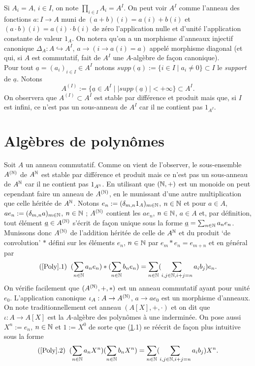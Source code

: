 Si $A_i=A$, $i\in I$, on note $\prod_{i\in I}A_i=A^I$. On peut  voir $A^I$
comme l'anneau des fonctions $a:I\rightarrow A$ muni de $(a+b)(i)=a(i)+b(i)$
et $(a\cdot b)(i)=a(i)\cdot b(i)$  de zéro l'application nulle et d'unité
l'application constante de valeur $1_A$. On notera qu'on a un morphisme
d'anneaux injectif canonique $\Delta_A:A\hookrightarrow A^I$, $a\rightarrow
(i\rightarrow a(i)=a)$ appelé morphisme diagonal (et qui, si $A$ est
commutatif,   fait de $A^I$  une $A$-algèbre de fa\c{c}on canonique).\\

Pour tout $\underline{a}=(a_i)_{i\in I}\in A^I$ notons
$supp(\underline{a}):=\lbrace i\in I\; |\; a_i\not= 0\rbrace\subset I$ le
\textit{support} de $\underline{a}$. Notons $$A^{(I)}:=\lbrace \underline{a}\in
A^I\; |\; |supp(\underline{a})|<+\infty\rbrace \subset A^I.$$ On observera que
$A^{(I)}\subset A^I$ est stable par différence et produit mais que, si $I$ est
infini, ce n'est pas un sous-anneau de $A^I$ car il ne contient pas $1_{A^I}$. 


\section{Algèbres de polynômes}\label{Poly}Soit $A$ un anneau commutatif.   
Comme on vient de l'observer, le sous-ensemble $A^{(\mathbb{N})}$ de $ A^{\mathbb{N}}$ est stable par différence et produit mais ce n'est pas un sous-anneau de $A^{\mathbb{N}}$ car il ne contient pas $1_{A^{\mathbb{N}}}$. En utilisant que $(\mathbb{N},+)$ est un monoide on peut cependant    faire un anneau de $A^{(\mathbb{N})}$, en le munissant d'une autre multiplication que celle héritée de $A^{\mathbb{N}}$. Notons  $e_n:=(\delta_{m,n}1_{A})_{m\in \mathbb{N}}$, $n\in \mathbb{N}$ et pour $a\in A$, $ae_n:=(\delta_{m,n}a)_{m\in \mathbb{N}}$, $n\in \mathbb{N}$ ; $A^{(\mathbb{N})}$ contient les $ae_n$, $n\in \mathbb{N}$, $a\in A$ et, par définition,  tout élément $\underline{a}\in A^{(\mathbb{N})}$ s'écrit de fa\c{c}on unique sous la forme $\underline{a}=\sum_{n\in \mathbb{N}}a_ne_n$. Munissons donc $A^{(\mathbb{N})}$ de l'addition héritée de celle de $A^{\mathbb{N}}$ et du produit `de convolution' $*$ défini sur les éléments $e_n$, $n\in \mathbb{N}$ par 
$e_m*e_n=e_{m+n} $ et en général par
$$(\ref{Poly}.1)\;\; (\sum_{n\in\mathbb{N}}a_ne_n) *(\sum_{n\in \mathbb{N}}b_ne_n)=\sum_{n\in \mathbb{N}}(\sum_{i,j\in \mathbb{N}, i+j=n}a_ib_j)e_n.$$
On vérifie facilement que $(A^{(\mathbb{N})},+,*)$ est un anneau commutatif ayant pour unité $e_0$. L'application canonique $\iota_A:A\rightarrow A^{(\mathbb{N})}$, $a\rightarrow ae_0  $  est un morphisme d'anneaux.
 On note traditionnellement cet anneau $(A[X],+,\cdot)$ et on dit que $\iota:A\rightarrow A[X]$ est la $A$-algèbre des polynômes à une inderminée. On pose aussi $X^n:=e_n$, $n\in \mathbb{N}$ et $1:=X^0$ de sorte que (\ref{Poly}.1) se réécrit de fa\c{c}on plus intuitive sous la forme
 $$(\ref{Poly}.2)\;\; (\sum_{n\in\mathbb{N}}a_nX^n)(\sum_{n\in \mathbb{N}}b_nX^n)=\sum_{n\in \mathbb{N}}(\sum_{i,j\in \mathbb{N}, i+j=n}a_ib_j)X^n.$$
 

